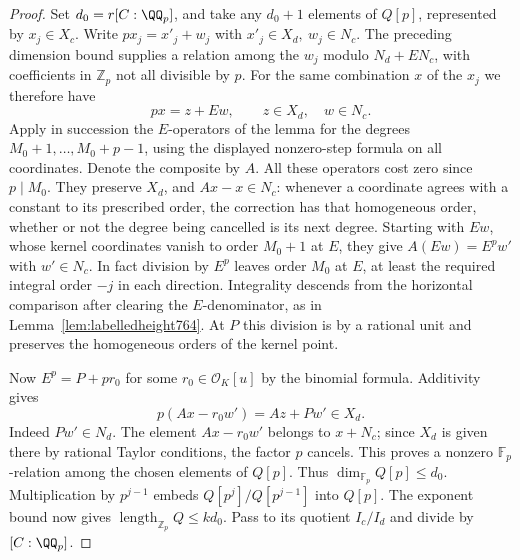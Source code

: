 \documentclass[a4paper,11pt]{article}
\theoremstyle{definition}
\theoremstyle{remark}
\newcommand{\ZZ}{\mathbb Z}\newcommand{\ord}{\operatorname{ord}}
\numberwithin{equation}{section}
\begin{document}
\begin{proof}
Set \(d_0=r[C:\QQ_p]\), and take any \(d_0+1\) elements
of \(Q[p]\), represented by \(x_j\in X_c\).
Write \(px_j=x'_j+w_j\) with \(x'_j\in X_d,\ w_j\in N_c\).
The preceding dimension bound supplies a relation among
the \(w_j\) modulo \(N_d+E N_c\), with coefficients in
\(\ZZ_p\) not all divisible by \(p\). For the same
combination \(x\) of the \(x_j\) we therefore have
\[
                      px=z+Ew,\qquad z\in X_d,\quad w\in N_c .
\]
Apply in succession the \(E\)-operators of the lemma for
the degrees \(M_0+1,\ldots,M_0+p-1\), using the displayed
nonzero-step formula on all coordinates. Denote the composite
by \(A\). All these operators cost zero since \(p\mid M_0\).
They preserve \(X_d\), and \(Ax-x\in N_c\): whenever a
coordinate agrees with a constant to its prescribed order,
the correction has that homogeneous order, whether or not
the degree being cancelled is its next degree. Starting
with \(Ew\), whose kernel coordinates vanish to order
\(M_0+1\) at \(E\), they give \(A(Ew)=E^p w'\) with
\(w'\in N_c\). In fact division by \(E^p\) leaves order
\(M_0\) at \(E\), at least the required integral order
\(-j\) in each direction. Integrality descends from the
horizontal comparison after clearing the \(E\)-denominator,
as in Lemma~\ref{lem:labelledheight764}. At \(P\) this
division is by a rational unit and preserves the homogeneous
orders of the kernel point.

Now \(E^p=P+p r_0\) for some \(r_0\in\mathcal O_K[u]\)
by the binomial formula. Additivity gives
\[
      p(Ax-r_0w')=Az+Pw'\in X_d .
\]
Indeed \(Pw'\in N_d\). The element \(Ax-r_0w'\) belongs to
\(x+N_c\); since \(X_d\) is given there by rational Taylor
conditions, the factor \(p\) cancels. This proves a nonzero
\(\mathbb F_p\)-relation among the chosen elements of \(Q[p]\).
Thus \(\dim_{\mathbb F_p}Q[p]\le d_0\). Multiplication by
\(p^{j-1}\) embeds \(Q[p^j]/Q[p^{j-1}]\) into \(Q[p]\).
The exponent bound now gives \(\operatorname{length}_{\ZZ_p}Q
\le k d_0\). Pass to its quotient \(I_c/I_d\) and divide
by \([C:\QQ_p]\).
\end{proof}
\end{document}
